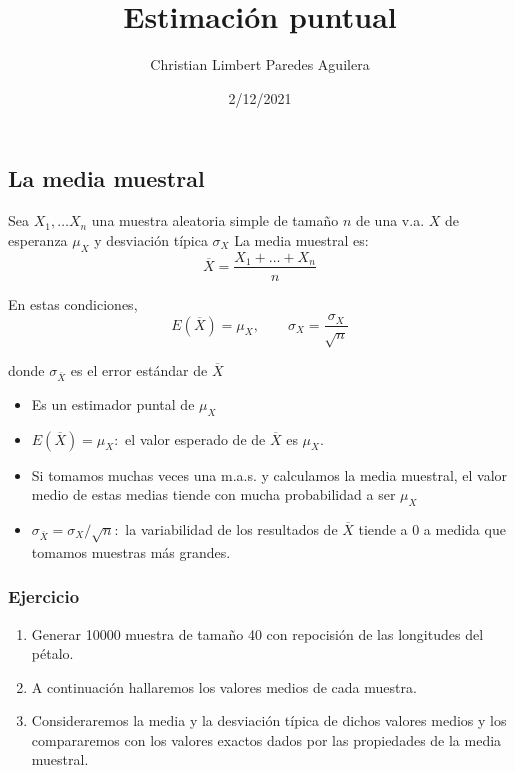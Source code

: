 \documentclass[
]{article}
\title{Estimación puntual}
\author{Christian Limbert Paredes Aguilera}
\date{2/12/2021}
\begin{document}
\maketitle

\hypertarget{la-media-muestral}{%
\subsection{La media muestral}\label{la-media-muestral}}

Sea \(X_1,\ldots X_n\) una muestra aleatoria simple de tamaño \(n\) de
una v.a. \(X\) de esperanza \(\mu_X\) y desviación típica \(\sigma_X\)
La media muestral es: \[\overline{X} = \dfrac{X_1+\ldots + X_n}{n}\]

En estas condiciones,
\[E(\overline{X})=\mu_X,\qquad \sigma_X = \dfrac{\sigma_X}{\sqrt{n}}\]

donde \(\sigma_{\overline{X}}\) es el error estándar de \(\overline{X}\)

\begin{itemize}
\item Es un estimador puntal de $\mu_X$
\item $E(\overline{X})=\mu_X:$ el valor esperado de de $\overline{X}$ es $\mu_X$.
\item Si tomamos muchas veces una m.a.s. y calculamos la media muestral, el valor medio de estas medias tiende con mucha probabilidad a ser $\mu_X$
\item $\sigma_{\overline{X}} = \sigma_X / \sqrt{n}:$ la variabilidad de los resultados de $\overline{X}$ tiende a $0$ a medida que tomamos muestras más grandes.
\end{itemize}

\hypertarget{ejercicio}{%
\subsubsection{Ejercicio}\label{ejercicio}}

\begin{enumerate}
\item Generar 10000 muestra de tamaño 40 con repocisión de las longitudes del pétalo.
\item A continuación hallaremos los valores medios de cada muestra.
\item Consideraremos la media y la desviación típica de dichos valores medios y los compararemos con los valores exactos dados por las propiedades de la media muestral.
\end{enumerate}
\end{document}
